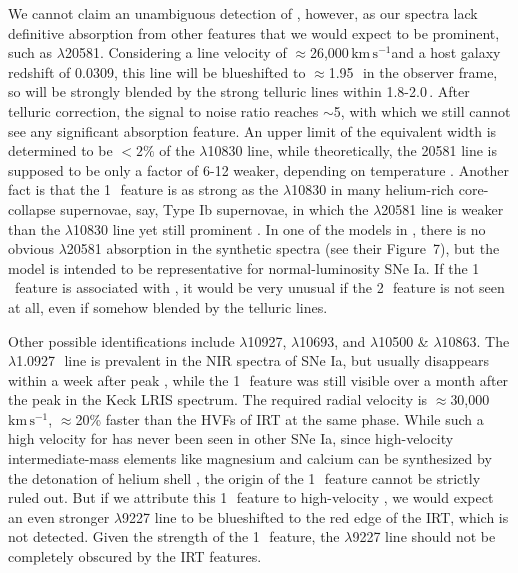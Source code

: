 \documentclass[twocolumn]{aastex631}
\newcommand{\kms}{$\mathrm{km}\,\mathrm{s}^{-1}$}
\begin{document}
We cannot claim an unambiguous detection of , however, as our spectra lack definitive absorption from other  features that we would expect to be prominent, such as  $\lambda$20581. Considering a line velocity of $\approx$26,000\,\kms and a host galaxy redshift of 0.0309, this line will be blueshifted to $\approx$1.95\,\micron\ in the observer frame, so will be strongly blended by the strong telluric lines within 1.8-2.0\,\micron. After telluric correction, the signal to noise ratio reaches $\sim$5, with which we still cannot see any significant absorption feature. An upper limit of the equivalent width is determined to be $<$$2\%$ of the  $\lambda$10830 line, while theoretically, the 20581 line is supposed to be only a factor of 6-12 weaker, depending on temperature \citep{Marion2009_NIR}. Another fact is that the 1\,\micron\ feature is as strong as the  $\lambda$10830 in many helium-rich core-collapse supernovae, say, Type Ib supernovae, in which the  $\lambda$20581 line is weaker than the  $\lambda$10830 line yet still prominent \citep{CSP_Ibc_2022}. In one of the models in \citet{Boyle2017_Helium}, there is no obvious  $\lambda$20581 absorption in the synthetic spectra (see their Figure~7), but the model is intended to be representative for normal-luminosity SNe Ia. If the 1\,\micron\ feature is associated with , it would be very unusual if the 2\,\micron\ feature is not seen at all, even if somehow blended by the telluric lines.

Other possible identifications include  $\lambda$10927,  $\lambda$10693, and  $\lambda$10500 \& $\lambda$10863. The  $\lambda$1.0927\,\micron\ line is prevalent in the NIR spectra of SNe Ia, but usually disappears within a week after peak \citep{Marion2009_NIR}, while the 1\,\micron\ feature was still visible over a month after the peak in the Keck LRIS spectrum. The required radial velocity is $\approx$30,000\,\kms, $\approx$20\% faster than the HVFs of  IRT at the same phase. While such a high velocity for  has never been seen in other SNe Ia, since high-velocity intermediate-mass elements like magnesium and calcium can be synthesized by the detonation of helium shell \citep{Shen_DD_2014}, the  origin of the 1\,\micron\ feature cannot be strictly ruled out. But if we attribute this 1\,\micron\ feature to high-velocity , we would expect an even stronger  $\lambda$9227 line to be blueshifted to the red edge of the  IRT, which is not detected. Given the strength of the 1\,\micron\ feature, the  $\lambda$9227 line should not be completely obscured by the  IRT features. 
\end{document}
